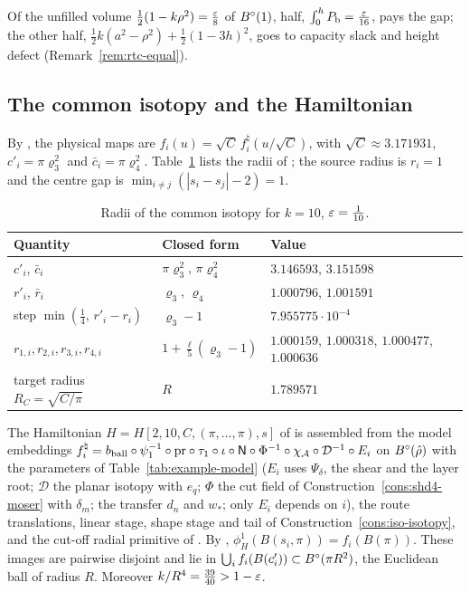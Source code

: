 Of the unfilled volume $\frac12(1-k\rho^2)=\frac{\varepsilon}8$ of $B^{\circ}(1)$, half, $\int_0^hP_{\mathrm b}=\frac{\varepsilon}{16}$, pays the gap; the other half, $\frac12k(a^2-\rho^2)+\frac12(1-3h)^2$, goes to capacity slack and height defect (Remark~\ref{rem:rtc-equal}).

\subsection{The common isotopy and the Hamiltonian}

By , the physical maps are $f_i(u)=\sqrt C\,f^\natural_i(u/\sqrt C)$, with $\sqrt C\approx3.171931$, $c'_i=\pi \varrho_3^2$ and $\bar c_i=\pi \varrho_4^2$. Table~\ref{tab:example-ham} lists the radii of ; the source radius is $r_i=1$ and the centre gap is $\min_{i\ne j}(|s_i-s_j|-2)=1$.

\begin{table}[ht]
\centering\footnotesize
\renewcommand{\arraystretch}{1.15}
\begin{tabular}{@{}p{}p{}p{}@{}}
\toprule
Quantity & Closed form & Value\\
\midrule
$c'_i$, $\bar c_i$ & $\pi \varrho_3^2$, $\pi \varrho_4^2$ & $3.146593$, $3.151598$\\
$r'_i$, $\bar r_i$ & $\varrho_3$, $\varrho_4$ & $1.000796$, $1.001591$\\
step $\min(\frac14,\,r'_i-r_i)$ & $\varrho_3-1$ & $7.955775\cdot10^{-4}$\\
$r_{1,i},r_{2,i},r_{3,i},r_{4,i}$ & $1+\frac\ell5(\varrho_3-1)$ & $1.000159$, $1.000318$, $1.000477$, $1.000636$\\
target radius $R_C=\sqrt{C/\pi}$ & $R$ & $1.789571$\\
\bottomrule
\end{tabular}
\caption{Radii of the common isotopy for $k=10$, $\varepsilon=\frac1{10}$.}
\label{tab:example-ham}
\end{table}

The Hamiltonian $H=H[2,10,C,(\pi,\dots,\pi),s]$ of  is assembled from the model
embeddings $f^\natural_i=b_{\rm ball}\circ\psi_1^{-1}\circ\mathrm{pr}\circ\tau_1\circ\iota\circ\mathsf N\circ\Phi^{-1}\circ\chi_{\mathcal A}\circ\mathcal D^{-1}\circ E_i$
on $B^{\circ}(\hat\rho)$ with the parameters of Table~\ref{tab:example-model} ($E_i$ uses $\Psi_\delta$, the shear and the
layer root; $\mathcal D$ the planar isotopy with $e_q$; $\Phi$ the cut field of Construction~\ref{cons:shd4-moser}
with $\delta_m$; the transfer $d_n$ and $w_*$; only $E_i$ depends on $i$), the route translations, linear stage,
shape stage and tail of Construction~\ref{cons:iso-isotopy}, and the cut-off radial primitive of
. By , $\phi^1_H(B(s_i,\pi))=f_i(B(\pi))$. These images are
pairwise disjoint and lie in $\bigcup_if_i(B(c'_i))\subset B^{\circ}(\pi R^2)$, the Euclidean ball of radius $R$. Moreover
$k/R^4=\frac{39}{40}>1-\varepsilon$.

